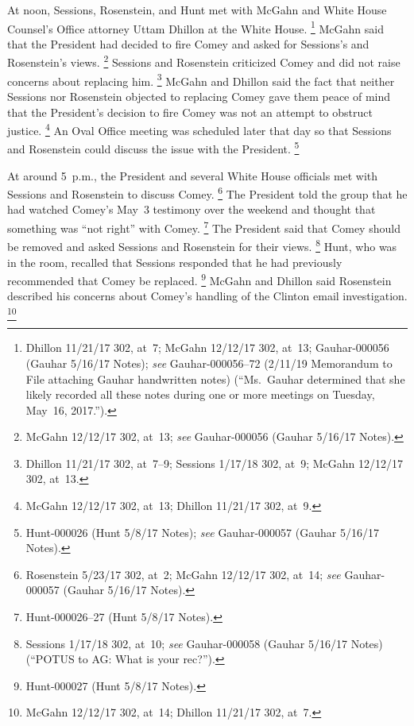 At noon, Sessions, Rosenstein, and Hunt met with McGahn and White House Counsel's Office attorney Uttam Dhillon at the White House.%
\footnote{Dhillon 11/21/17 302, at~7;
McGahn 12/12/17 302, at~13;
Gauhar-000056 (Gauhar 5/16/17 Notes);
\textit{see} Gauhar-000056--72 (2/11/19 Memorandum to File attaching Gauhar handwritten notes) (``Ms.~Gauhar determined that she likely recorded all these notes during one or more meetings on Tuesday, May~16, 2017.'').}
McGahn said that the President had decided to fire Comey and asked for Sessions's and Rosenstein's views.%
\footnote{McGahn 12/12/17 302, at~13;
\textit{see} Gauhar-000056 (Gauhar 5/16/17 Notes).}
Sessions and Rosenstein criticized Comey and did not raise concerns about replacing him.%
\footnote{Dhillon 11/21/17 302, at~7--9;
Sessions 1/17/18 302, at~9;
McGahn 12/12/17 302, at~13.}
McGahn and Dhillon said the fact that neither Sessions nor Rosenstein objected to replacing Comey gave them peace of mind that the President's decision to fire Comey was not an attempt to obstruct justice.%
\footnote{McGahn 12/12/17 302, at~13;
Dhillon 11/21/17 302, at~9.}
An Oval Office meeting was scheduled later that day so that Sessions and Rosenstein could discuss the issue with the President.%
\footnote{Hunt-000026 (Hunt 5/8/17 Notes);
\textit{see} Gauhar-000057 (Gauhar 5/16/17 Notes).}

At around 5~p.m., the President and several White House officials met with Sessions and Rosenstein to discuss Comey.%
\footnote{Rosenstein 5/23/17 302, at~2;
McGahn 12/12/17 302, at~14;
\textit{see} Gauhar-000057 (Gauhar 5/16/17 Notes).}
The President told the group that he had watched Comey's May~3 testimony over the weekend and thought that something was ``not right'' with Comey.%
\footnote{Hunt-000026--27 (Hunt 5/8/17 Notes).}
The President said that Comey should be removed and asked Sessions and Rosenstein for their views.%
\footnote{Sessions 1/17/18 302, at~10;
\textit{see} Gauhar-000058 (Gauhar 5/16/17 Notes) (``POTUS to AG: What is your rec?'').}
Hunt, who was in the room, recalled that Sessions responded that he had previously recommended that Comey be replaced.%
\footnote{Hunt-000027 (Hunt 5/8/17 Notes).}
McGahn and Dhillon said Rosenstein described his concerns about Comey's handling of the Clinton email investigation.%
\footnote{McGahn 12/12/17 302, at~14;
Dhillon 11/21/17 302, at~7.}


